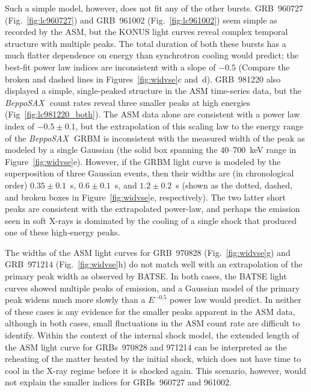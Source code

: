 \documentclass{aastex}
\def\sax{{\it BeppoSAX\,}}
\begin{document}
\begin{multicols}{2}
Such a simple model, however, does not fit any of the other bursts.
GRB~960727 (Fig.~\ref{fig:lc960727}) and GRB~961002
(Fig.~\ref{fig:lc961002}) seem simple as recorded by the ASM, but the
KONUS light curves reveal complex temporal structure with multiple
peaks.  The total duration of both these bursts has a much flatter
dependence on energy than synchrotron cooling would predict; the
best-fit power law indices are inconsistent with a slope of $-0.5$
(Compare the broken and dashed lines in Figures~\ref{fig:widvse}c
and~d).  GRB~981220 also displayed a simple, single-peaked structure
in the ASM time-series data, but the \sax~count rates reveal three
smaller peaks at high energies (Fig~\ref{fig:lc981220_both}).  The ASM
data alone are consistent with a power law index of $-0.5\pm0.1$, but
the extrapolation of this scaling law to the energy range of the
\sax~GRBM is inconsistent with the measured width of the peak as
modeled by a single Gaussian (the solid box spanning the 40--700~keV
range in Figure~\ref{fig:widvse}e).  However, if the GRBM light curve
is modeled by the superposition of three Gaussian events, then their
widths are (in chronological order) $0.35\pm0.1$~s, $0.6\pm0.1$~s, and
$1.2\pm0.2$~s (shown as the dotted, dashed, and broken boxes in
Figure~\ref{fig:widvse}e, respectively).  The two latter short peaks
are consistent with the extrapolated power-law, and perhaps the
emission seen in soft X-rays is dominated by the cooling of a single
shock that produced one of these high-energy peaks.

The widths of the ASM light curves for GRB~970828
(Fig.~\ref{fig:widvse}g) and GRB~971214 (Fig.~\ref{fig:widvse}h) do
not match well with an extrapolation of the primary peak width as
observed by BATSE.  In both cases, the BATSE light curves showed
multiple peaks of emission, and a Gaussian model of the primary peak
widens much more slowly than a $E^{-0.5}$ power law would predict.  In
neither of these cases is any evidence for the smaller peaks apparent
in the ASM data, although in both cases, small fluctuations in the ASM
count rate are difficult to identify.  Within the context of the
internal shock model, the extended length of the ASM light curve for
GRBs~970828 and 971214 can be interpreted as the reheating of the
matter heated by the initial shock, which does not have time to cool
in the X-ray regime before it is shocked again.  This scenario,
however, would not explain the smaller indices for GRBs~960727 and
961002.


\end{multicols}
\end{document}
